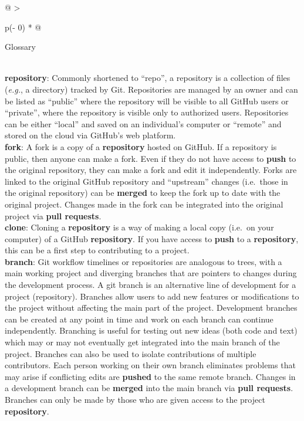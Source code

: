 \begin{tablenos:no-prefix-table-caption}

\begin{longtable}[]{@{}
  >{\raggedright\arraybackslash}p{(\columnwidth - 0\tabcolsep) * }@{}}
\toprule
\begin{minipage}[b]{\linewidth}\raggedright
Glossary
\end{minipage} \\
\midrule
\endhead
\textbf{repository}: Commonly shortened to ``repo'', a repository is a collection of files (\emph{e.g.}, a directory) tracked by Git. Repositories are managed by an owner and can be listed as ``public'' where the repository will be visible to all GitHub users or ``private'', where the repository is visible only to authorized users. Repositories can be either ``local'' and saved on an individual's computer or ``remote'' and stored on the cloud via GitHub's web platform. \\
\textbf{fork}: A fork is a copy of a \textbf{repository} hosted on GitHub. If a repository is public, then anyone can make a fork. Even if they do not have access to \textbf{push} to the original repository, they can make a fork and edit it independently. Forks are linked to the original GitHub repository and ``upstream'' changes (i.e.~those in the original repository) can be \textbf{merged} to keep the fork up to date with the original project. Changes made in the fork can be integrated into the original project via \textbf{pull requests}. \\
\textbf{clone}: Cloning a \textbf{repository} is a way of making a local copy (i.e.~on your computer) of a GitHub \textbf{repository}. If you have access to \textbf{push} to a \textbf{repository}, this can be a first step to contributing to a project. \\
\textbf{branch}: Git workflow timelines or repositories are analogous to trees, with a main working project and diverging branches that are pointers to changes during the development process. A git branch is an alternative line of development for a project (repository). Branches allow users to add new features or modifications to the project without affecting the main part of the project. Development branches can be created at any point in time and work on each branch can continue independently. Branching is useful for testing out new ideas (both code and text) which may or may not eventually get integrated into the main branch of the project. Branches can also be used to isolate contributions of multiple contributors. Each person working on their own branch eliminates problems that may arise if conflicting edits are \textbf{pushed} to the same remote branch. Changes in a development branch can be \textbf{merged} into the main branch via \textbf{pull requests}. Branches can only be made by those who are given access to the project \textbf{repository}. \\

\end{longtable}
\end{tablenos:no-prefix-table-caption}
